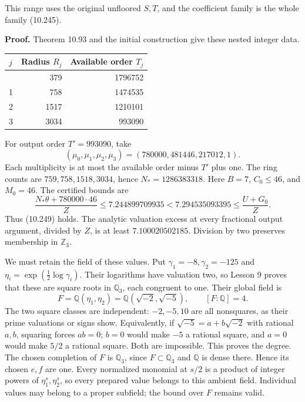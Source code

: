 \documentclass[
  11pt,
  a4paper,
]{article}
\newcounter{none} %
\begin{document}
This range uses the original unfloored \(S,T\), and the coefficient
family is the whole family (10.245).

\textbf{Proof.} Theorem 10.93 and the initial construction give these
nested integer data.

{\def\LTcaptype{none} %
\begin{longtable}[]{@{}lrr@{}}
\toprule\noalign{}
\(j\) & Radius \(R_j\) & Available order \(T_j\) \\
\midrule\noalign{}
\endhead
\bottomrule\noalign{}
\endlastfoot
0 & 379 & 1796752 \\
1 & 758 & 1474535 \\
2 & 1517 & 1210101 \\
3 & 3034 & 993090 \\
\end{longtable}
}

For output order \(T'=993090\), take \[
(\mu_0,\mu_1,\mu_2,\mu_3)=(780000,481446,217012,1).
\] Each multiplicity is at most the available order minus \(T'\) plus
one. The ring counts are \(759,758,1518,3034\), hence
\(N_*=1286383318\). Here \(B=7\), \(C_0\le46\), and \(M_0=46\). The
certified bounds are \[
\frac{N_*\theta+780000\cdot46}{Z}\le7.244899709935
<7.294535093395\le\frac{U+G_0}{Z}.
\] Thus (10.249) holds. The analytic valuation excess at every
fractional output argument, divided by \(Z\), is at least
\(7.100020502185\). Division by two preserves membership in
\(\mathbb Z_3\).

We must retain the field of these values. Put
\(\gamma_1=-8,\gamma_2=-125\) and \(\eta_i=\exp(\tfrac12\log\gamma_i)\).
Their logarithms have valuation two, so Lesson 9 proves that these are
square roots in \(\mathbb Q_3\), each congruent to one. Their global
field is \[
F=\mathbb Q(\eta_1,\eta_2)
=\mathbb Q(\sqrt{-2},\sqrt{-5}),\qquad [F:\mathbb Q]=4.
\] The two square classes are independent: \(-2,-5,10\) are all
nonsquares, as their prime valuations or signs show. Equivalently, if
\(\sqrt{-5}=a+b\sqrt{-2}\) with rational \(a,b\), squaring forces
\(ab=0\); \(b=0\) would make \(-5\) a rational square, and \(a=0\) would
make \(5/2\) a rational square. Both are impossible. This proves the
degree. The chosen completion of \(F\) is \(\mathbb Q_3\), since
\(F\subset\mathbb Q_3\) and \(\mathbb Q\) is dense there. Hence its
chosen \(e,f\) are one. Every normalized monomial at \(s/2\) is a
product of integer powers of \(\eta_1^s,\eta_2^s\), so every prepared
value belongs to this ambient field. Individual values may belong to a
proper subfield; the bound over \(F\) remains valid.
\end{document}
